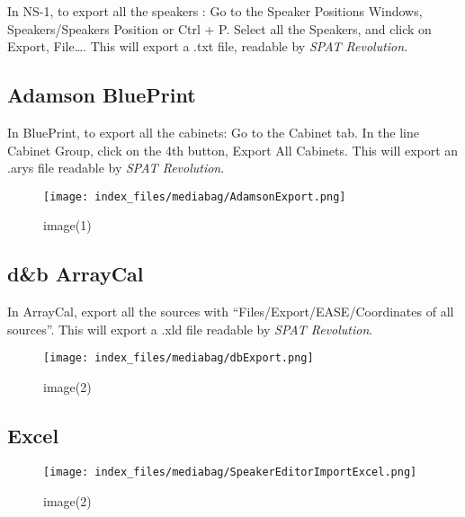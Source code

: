 \documentclass[
  letterpaper,
  DIV=11,
  numbers=noendperiod]{scrreport}
\begin{document}
In NS-1, to export all the speakers : Go to the Speaker Positions
Windows, Speakers/Speakers Position or Ctrl + P. Select all the
Speakers, and click on Export, File\ldots{}. This will export a .txt
file, readable by \emph{SPAT Revolution}.

\hypertarget{adamson-blueprint}{%
\subsection{Adamson BluePrint}\label{adamson-blueprint}}

In BluePrint, to export all the cabinets: Go to the Cabinet tab. In the
line Cabinet Group, click on the 4th button, Export All Cabinets. This
will export an .arys file readable by \emph{SPAT Revolution}.

\begin{figure}

{\centering \texttt{[image: index\_files/mediabag/AdamsonExport.png]}

}

\caption{image(1)}

\end{figure}

\hypertarget{db-arraycal}{%
\subsection{d\&b ArrayCal}\label{db-arraycal}}

In ArrayCal, export all the sources with ``Files/Export/EASE/Coordinates
of all sources''. This will export a .xld file readable by \emph{SPAT
Revolution}.

\begin{figure}

{\centering \texttt{[image: index\_files/mediabag/dbExport.png]}

}

\caption{image(2)}

\end{figure}

\hypertarget{excel}{%
\subsection{Excel}\label{excel}}

\begin{figure}

{\centering \texttt{[image: index\_files/mediabag/SpeakerEditorImportExcel.png]}

}

\caption{image(2)}

\end{figure}
\end{document}
